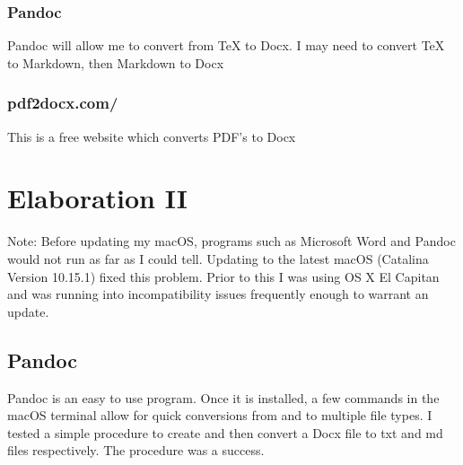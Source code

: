 \documentclass{article}
\begin{document}
\subsubsection{Pandoc}

Pandoc will allow me to convert from TeX to Docx. I may need to convert TeX to Markdown, then Markdown to Docx

\subsubsection{pdf2docx.com/}

This is a free website which converts PDF's to Docx

\section{Elaboration II}

Note: Before updating my macOS, programs such as Microsoft Word and Pandoc would not run as far as I could tell. Updating to the latest macOS (Catalina Version 10.15.1) fixed this problem. Prior to this I was using OS X El Capitan and was running into incompatibility issues frequently enough to warrant an update.

\subsection{Pandoc}

Pandoc is an easy to use program. Once it is installed, a few commands in the macOS terminal allow for quick conversions from and to multiple file types. I tested a simple procedure to create and then convert a Docx file to txt and md files respectively. The procedure was a success.
\end{document}
